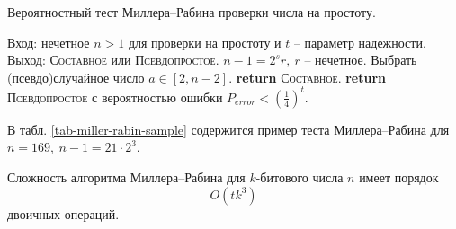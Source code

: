 \begin{algorithm}[iht]
    \caption{Вероятностный тест Миллера--Рабина проверки числа на простоту.\label{miller-rabin}}
    \begin{algorithmic}
        \STATE Вход: нечетное $n>1$ для проверки на простоту и $t$ -- параметр надежности.
        \STATE Выход: \textsc{Составное} или \textsc{Псевдопростое}.
        \STATE $n - 1 = 2^s r, ~ r$ -- нечетное.
            \STATE Выбрать (псевдо)случайное число $a \in [2, n-2]$.
               \STATE \textbf{return} \textsc{Составное}.
           \ENDIF
        \ENDFOR
       \STATE \textbf{return} \textsc{Псевдопростое} с вероятностью ошибки $P_{error} < \left( \frac{1}{4} \right)^t$.
    \end{algorithmic}
\end{algorithm}

\example
В табл. \ref{tab-miller-rabin-sample} содержится пример теста Миллера--Рабина для $n = 169, ~ n-1 = 21 \cdot 2^3$.
\begin{table}[h!]
    \centering
    \caption{Пример теста Миллера--Рабина для $n = 169$ и четырех оснований $a$: 19, 22, 23, 2\label{tab-miller-rabin-sample}}
\end{table}
\exampleend

Сложность алгоритма Миллера--Рабина для $k$-битового числа $n$ имеет порядок
    \[ O(t k^3) \]
двоичных операций.
